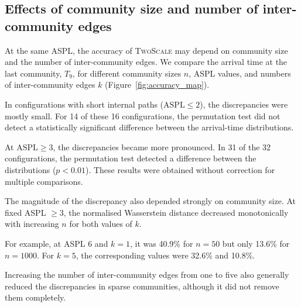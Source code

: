 \documentclass[a4paper,fleqn]{cas-sc}
\newcommand{\TS}{\textup{\textsc{TwoScale}}}
\begin{document}
\subsection{Effects of community size and number of inter-community edges}
\label{sec:res_size}

At the same ASPL, the accuracy of \TS{} may depend on community size and the number of inter-community edges. We compare the arrival time at the last community, $T_9$, for different community sizes $n$, ASPL values, and numbers of inter-community edges $k$ (Figure~\ref{fig:accuracy_map}).

In configurations with short internal paths ($\mathrm{ASPL}\leq2$), the discrepancies were mostly small. For 14 of these 16 configurations, the permutation test did not detect a statistically significant difference between the arrival-time distributions.

At $\mathrm{ASPL}\geq3$, the discrepancies became more pronounced. In 31 of the 32 configurations, the permutation test detected a difference between the distributions ($p<0.01$). These results were obtained without correction for multiple comparisons.

The magnitude of the discrepancy also depended strongly on community size. At fixed ASPL $\geq3$, the normalised Wasserstein distance decreased monotonically with increasing $n$ for both values of $k$.

For example, at ASPL 6 and $k=1$, it was 40.9\% for $n=50$ but only 13.6\% for $n=1000$. For $k=5$, the corresponding values were 32.6\% and 10.8\%.

Increasing the number of inter-community edges from one to five also generally reduced the discrepancies in sparse communities, although it did not remove them completely.
\end{document}
